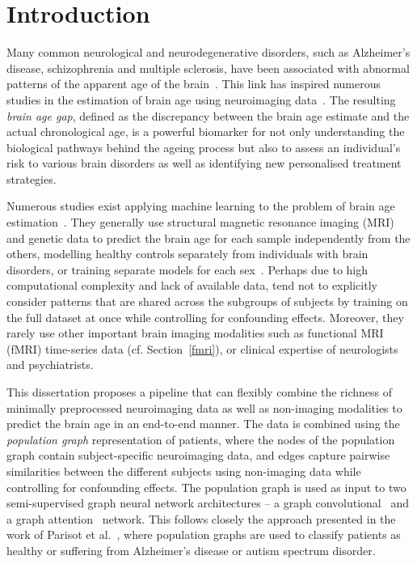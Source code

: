 \chapter{Introduction}



Many common neurological and neurodegenerative disorders, such as Alzheimer’s disease, schizophrenia and multiple sclerosis, have been associated with abnormal patterns of the apparent age of the brain~\cite{kaufmann2019}. This link has inspired numerous studies in the estimation of brain age using neuroimaging data~\cite{franke2019ten}. The resulting \textit{brain age gap}, defined as the discrepancy between the brain age estimate and the actual chronological age, is a powerful biomarker for not only understanding the biological pathways behind the ageing process but also to assess an individual’s risk to various brain disorders as well as identifying new personalised treatment strategies.


Numerous studies exist applying machine learning to the problem of brain age estimation~\cite{franke2019ten}. They generally use structural magnetic resonance imaging (MRI) and genetic data to predict the brain age for each sample independently from the others, modelling healthy controls separately from individuals with brain disorders, or training separate models for each sex~\cite{kaufmann2019,niu2019improved}. Perhaps due to high computational complexity and lack of available data, tend not to explicitly consider patterns that are shared across the subgroups of subjects by training on the full dataset at once while controlling for confounding effects. Moreover, they rarely use other important brain imaging modalities such as functional MRI (fMRI) time-series data (cf. Section~\ref{fmri}), or clinical expertise of neurologists and psychiatrists.


This dissertation proposes a pipeline that can flexibly combine the richness of minimally preprocessed neuroimaging data as well as non-imaging modalities to predict the brain age in an end-to-end manner. The data is combined using the \textit{population graph} representation of patients, where the nodes of the population graph contain subject-specific neuroimaging data, and edges capture pairwise similarities between the different subjects using non-imaging data while controlling for confounding effects. The population graph is used as input to two semi-supervised graph neural network architectures – a graph convolutional~\cite{kipf2017semi} and a graph attention~\cite{velickovic2018graph} network. This follows closely the approach presented in the work of Parisot et al.~\cite{parisot2017spectral,parisot2018disease}, where population graphs are used to classify patients as healthy or suffering from Alzheimer's disease or autism spectrum disorder.

